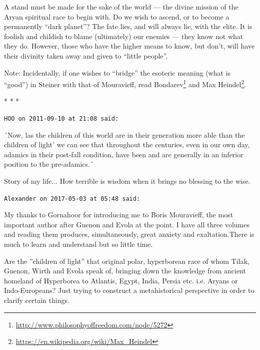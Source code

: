 A stand must be made for the sake of the world --- the divine mission of the Aryan spiritual race to begin with. Do we wish to ascend, or to become a permanently ``dark planet''? The fate lies, and will always lie, with the elite. It is foolish and childish to blame (ultimately) our enemies --- they know not what they do. However, those who have the higher means to know, but don't, will have their divinity taken away and given to ``little people''.

Note: Incidentally, if one wishes to ``bridge'' the esoteric meaning (what is ``good'') in Steiner with that of Mouravieff, read Bondarev\footnote{\url{http://www.philosophyoffreedom.com/node/5272}} and Max Heindel\footnote{\url{https://en.wikipedia.org/wiki/Max\_Heindel}}.



\begin{center}* * *\end{center}

\begin{footnotesize}
\begin{sffamily}
\texttt{HOO on 2011-09-10 at 21:08 said:}

´Now, las the children of this world are in their generation more able than the children of light' we can see that throughout the centuries, even in our own day, adamics in their post-fall condition, have been and are generally in an inferior position to the pre-adamics.´

Story of my life... How terrible is wisdom when it brings no blessing to the wise.

\hfill

\texttt{Alexander on 2017-05-03 at 05:48 said:}

My thanks to Gornahoor for introducing me to Boris Mouravieff, the most important author after Guenon and Evola at the point. I have all three volumes and reading them produces, simultaneously, great anxiety and exaltation.There is much to learn and understand but so little time.

Are the ''children of light'' that original polar, hyperborean race of whom Tilak, Guenon, Wirth and Evola speak of, bringing down the knowledge from ancient homeland of Hyperborea to Atlantis, Egypt, India, Persia etc. i.e. Aryans or Indo-Europeans? Just trying to construct a metahistorical perspective in order to clarify certain things.


\hfill

\end{sffamily}
\end{footnotesize}

